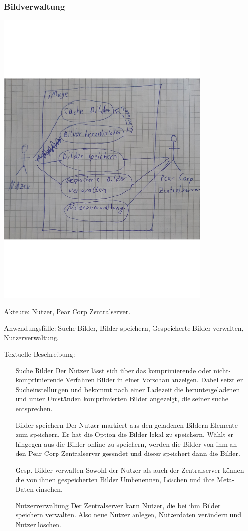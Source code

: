 \documentclass[parskip=full]{scrartcl}
\begin{document}
\subsubsection{Bildverwaltung}
\begin{center}
\includegraphics[width=0.8\textwidth]{Anwendungsfalldiagramm.pdf}
\end{center}

Akteure: Nutzer, Pear Corp Zentralserver.

Anwendungsfälle: Suche Bilder, Bilder speichern, Gespeicherte Bilder verwalten, Nutzerverwaltung.

Textuelle Beschreibung:
\begin{itemize}
	\item[Suche Bilder] Der Nutzer lässt sich über das komprimierende oder nicht-komprimierende Verfahren Bilder in einer Vorschau anzeigen. Dabei setzt er Sucheinstellungen und bekommt nach einer Ladezeit die heruntergeladenen und unter Umständen komprimierten Bilder angezeigt, die seiner suche entsprechen.
	\item[Bilder speichern] Der Nutzer markiert aus den geladenen Bildern Elemente zum speichern. Er hat die Option die Bilder lokal zu speichern. Wählt er hingegen aus die Bilder online zu speichern, werden die Bilder von ihm an den Pear Corp Zentralserver gesendet und dieser speichert dann die Bilder.
	\item[Gesp. Bilder verwalten] Sowohl der Nutzer als auch der Zentralserver können die von ihnen gespeicherten Bilder Umbenennen, Löschen und ihre \Gls{Meta-Daten} einsehen.
	\item[Nutzerverwaltung] Der Zentralserver kann Nutzer, die bei ihm Bilder speichern verwalten. Also neue Nutzer anlegen, Nutzerdaten verändern und Nutzer löschen.
\end{itemize}
\end{document}
